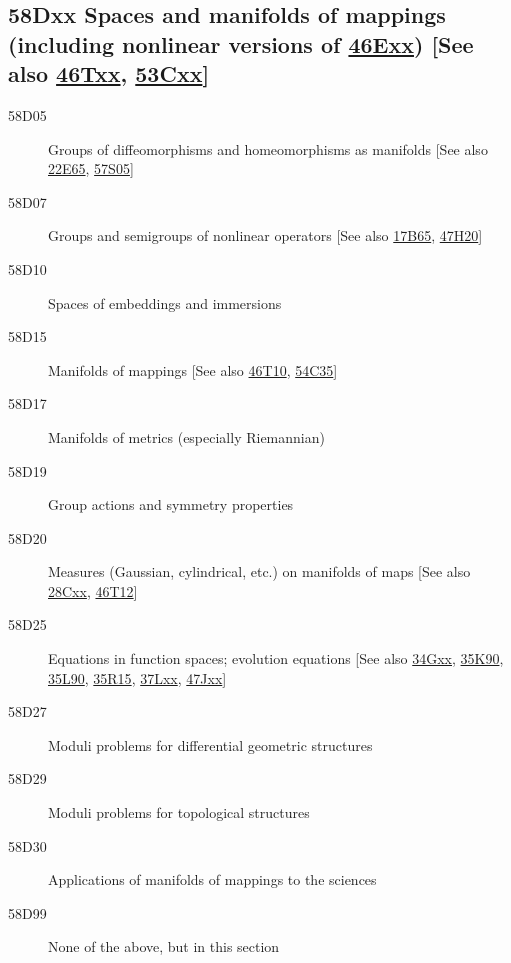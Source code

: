 \documentclass[letterpaper]{article}
\begin{document}
\subsection*{58Dxx  Spaces and manifolds of mappings (including nonlinear versions of \hyperref[46Exx]{46Exx}) [See also \hyperref[46Txx]{46Txx}, \hyperref[53Cxx]{53Cxx}] }\label{58Dxx}
\begin{description}  
\item [58D05]\label{58D05} Groups of diffeomorphisms and homeomorphisms as manifolds [See also \hyperref[22E65]{22E65}, \hyperref[57S05]{57S05}]
\item [58D07]\label{58D07} Groups and semigroups of nonlinear operators [See also \hyperref[17B65]{17B65}, \hyperref[47H20]{47H20}]
\item [58D10]\label{58D10} Spaces of embeddings and immersions
\item [58D15]\label{58D15} Manifolds of mappings [See also \hyperref[46T10]{46T10}, \hyperref[54C35]{54C35}]
\item [58D17]\label{58D17} Manifolds of metrics (especially Riemannian)
\item [58D19]\label{58D19} Group actions and symmetry properties
\item [58D20]\label{58D20} Measures (Gaussian, cylindrical, etc.) on manifolds of maps [See also \hyperref[28Cxx]{28Cxx}, \hyperref[46T12]{46T12}]
\item [58D25]\label{58D25} Equations in function spaces; evolution equations [See also \hyperref[34Gxx]{34Gxx}, \hyperref[35K90]{35K90}, \hyperref[35L90]{35L90}, \hyperref[35R15]{35R15}, \hyperref[37Lxx]{37Lxx}, \hyperref[47Jxx]{47Jxx}]
\item [58D27]\label{58D27} Moduli problems for differential geometric structures
\item [58D29]\label{58D29} Moduli problems for topological structures
\item [58D30]\label{58D30} Applications of manifolds of mappings to the sciences
\item [58D99]\label{58D99} None of the above, but in this section
\end{description}
\end{document}
